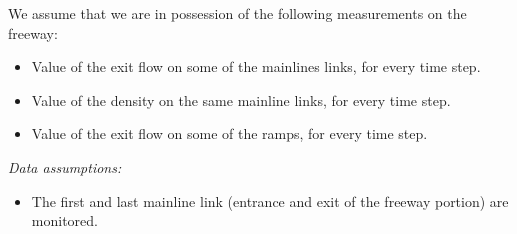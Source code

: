 We assume that we are in possession of the following measurements on the freeway:
\begin{itemize}
	\item Value of the exit flow on some of the mainlines links, for every time step.
	\item Value of the density on the same mainline links, for every time step.
	\item Value of the exit flow on some of the ramps, for every time step.
\end{itemize}

\emph{Data assumptions:}
\begin{itemize}
	\item The first and last mainline link (entrance and exit of the freeway portion) are monitored. 
\end{itemize}